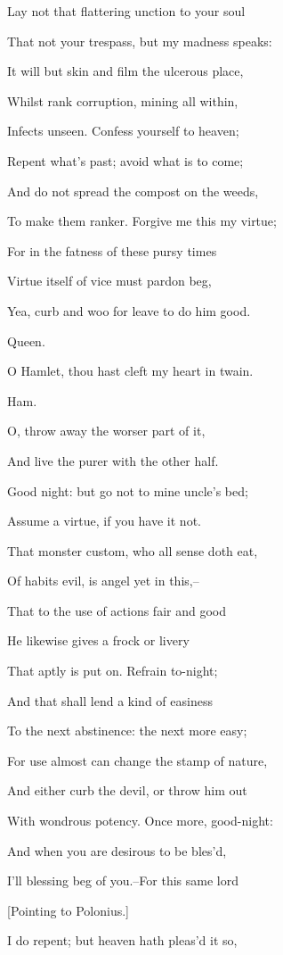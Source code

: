 \documentclass[12pt]{book}
\begin{document}
Lay not that flattering unction to your soul

That not your trespass, but my madness speaks:

It will but skin and film the ulcerous place,

Whilst rank corruption, mining all within,

Infects unseen. Confess yourself to heaven;

Repent what's past; avoid what is to come;

And do not spread the compost on the weeds,

To make them ranker. Forgive me this my virtue;

For in the fatness of these pursy times

Virtue itself of vice must pardon beg,

Yea, curb and woo for leave to do him good.



Queen.

O Hamlet, thou hast cleft my heart in twain.



Ham.

O, throw away the worser part of it,

And live the purer with the other half.

Good night: but go not to mine uncle's bed;

Assume a virtue, if you have it not.

That monster custom, who all sense doth eat,

Of habits evil, is angel yet in this,--

That to the use of actions fair and good

He likewise gives a frock or livery

That aptly is put on. Refrain to-night;

And that shall lend a kind of easiness

To the next abstinence: the next more easy;

For use almost can change the stamp of nature,

And either curb the devil, or throw him out

With wondrous potency. Once more, good-night:

And when you are desirous to be bles'd,

I'll blessing beg of you.--For this same lord

[Pointing to Polonius.]

I do repent; but heaven hath pleas'd it so,
\end{document}
